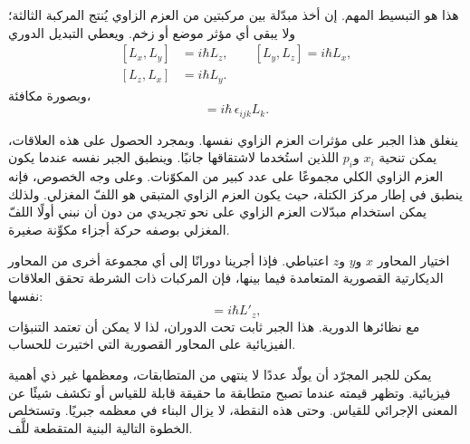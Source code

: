 هذا هو التبسيط المهم. إن أخذ مبدّلة بين مركبتين من العزم الزاوي يُنتج المركبة الثالثة؛ ولا يبقى أي مؤثر موضع أو زخم. ويعطي التبديل الدوري
\begin{equation}
\begin{aligned}
[L_x,L_y]&=i\hbar L_z,\qquad
[L_y,L_z]=i\hbar L_x,\\
[L_z,L_x]&=i\hbar L_y.
\end{aligned}
\end{equation}
وبصورة مكافئة،
\begin{equation}
[L_i,L_j]=i\hbar\,\epsilon_{ijk}L_k.
\end{equation}

ينغلق هذا الجبر على مؤثرات العزم الزاوي نفسها. وبمجرد الحصول على هذه العلاقات، يمكن تنحية \(x_i\) و\(p_i\) اللذين استُخدما لاشتقاقها جانبًا. وينطبق الجبر نفسه عندما يكون العزم الزاوي الكلي مجموعًا على عدد كبير من المكوّنات. وعلى وجه الخصوص، فإنه ينطبق في إطار مركز الكتلة، حيث يكون العزم الزاوي المتبقي هو اللفّ المغزلي. ولذلك يمكن استخدام مبدّلات العزم الزاوي على نحو تجريدي من دون أن نبني أولًا اللفّ المغزلي بوصفه حركة أجزاء مكوِّنة صغيرة.

اختيار المحاور \(x\) و\(y\) و\(z\) اعتباطي. فإذا أجرينا دورانًا إلى أي مجموعة أخرى من المحاور الديكارتية القصورية المتعامدة فيما بينها، فإن المركبات ذات الشرطة تحقق العلاقات نفسها:
\begin{equation}
[L'_x,L'_y]=i\hbar L'_z,
\end{equation}
مع نظائرها الدورية. هذا الجبر ثابت تحت الدوران، لذا لا يمكن أن تعتمد التنبؤات الفيزيائية على المحاور القصورية التي اختيرت للحساب.

\begin{classroomqa}
\end{classroomqa}

يمكن للجبر المجرّد أن يولّد عددًا لا ينتهي من المتطابقات، ومعظمها غير ذي أهمية فيزيائية. وتظهر قيمته عندما تصبح متطابقة ما حقيقة قابلة للقياس أو تكشف شيئًا عن المعنى الإجرائي للقياس. وحتى هذه النقطة، لا يزال البناء في معظمه جبريًا. وتستخلص الخطوة التالية البنية المتقطعة للَّف.

\begin{classroomqa}
\end{classroomqa}

